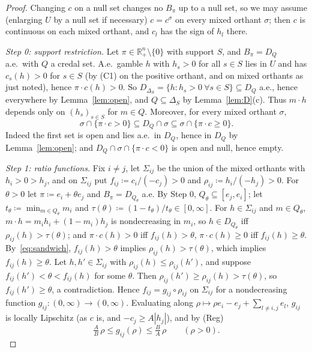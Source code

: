 \documentclass[11pt]{article}
\newcommand{\R}{\mathbb{R}}
\theoremstyle{plain}
\theoremstyle{definition}
\theoremstyle{remark}
\begin{document}
\begin{proof}
Changing $c$ on a null set changes no $B_\pi$ up to a null set, so we may assume
(enlarging $U$ by a null set if necessary) $c=c^\sigma$ on every mixed orthant $\sigma$; then $c$ is continuous on each mixed orthant,
and $c_l$ has the sign of $h_l$ there.

\emph{Step 0: support restriction.} Let $\pi\in\R^n_+\setminus\{0\}$ with support $S$, and
$B_\pi=D_Q$ a.e.\ with $Q$ a credal set. A.e.\ gamble $h$ with $h_s>0$ for all $s\in S$
lies in $U$ and has $c_s(h)>0$ for $s\in S$ (by (C1) on the positive orthant, and on mixed
orthants as just noted), hence $\pi\cdot c(h)>0$. So $D_{\Delta_S}=\{h:h_s>0\ \forall s\in
S\}\subseteq D_Q$ a.e., hence everywhere by Lemma~\ref{lem:open}, and $Q\subseteq\Delta_S$
by Lemma~\ref{lem:D}(c). Thus $m\cdot h$ depends only on $(h_s)_{s\in S}$ for $m\in Q$.
Moreover, for every mixed orthant $\sigma$,
\begin{equation}\label{eq:sandwich}
  \sigma\cap\{\pi\cdot c>0\}\subseteq D_Q\cap\sigma\subseteq\sigma\cap\{\pi\cdot c\ge0\}.
\end{equation}
Indeed the first set is open and lies a.e.\ in $D_Q$, hence in $D_Q$ by
Lemma~\ref{lem:open}; and $D_Q\cap\sigma\cap\{\pi\cdot c<0\}$ is open and null, hence
empty.

\emph{Step 1: ratio functions.} Fix $i\ne j$, let $\Sigma_{ij}$ be the union of the mixed
orthants with $h_i>0>h_j$, and on $\Sigma_{ij}$ put $f_{ij}\coloneqq c_i/(-c_j)>0$ and
$\rho_{ij}\coloneqq h_i/(-h_j)>0$. For $\theta>0$ let $\pi\coloneqq e_i+\theta e_j$ and
$B_\pi=D_{Q_\theta}$ a.e. By Step 0, $Q_\theta\subseteq[e_j,e_i]$; let $t_\theta\coloneqq
\min_{m\in Q_\theta}m_i$ and $\tau(\theta)\coloneqq(1-t_\theta)/t_\theta\in[0,\infty]$. For
$h\in\Sigma_{ij}$ and $m\in Q_\theta$, $m\cdot h=m_ih_i+(1-m_i)h_j$ is nondecreasing in
$m_i$, so $h\in D_{Q_\theta}$ iff $\rho_{ij}(h)>\tau(\theta)$; and $\pi\cdot c(h)>0$ iff
$f_{ij}(h)>\theta$, $\pi\cdot c(h)\ge0$ iff $f_{ij}(h)\ge\theta$. By~\eqref{eq:sandwich},
$f_{ij}(h)>\theta$ implies $\rho_{ij}(h)>\tau(\theta)$, which implies $f_{ij}(h)\ge\theta$.
Let $h,h'\in\Sigma_{ij}$ with $\rho_{ij}(h)\le\rho_{ij}(h')$, and suppose
$f_{ij}(h')<\theta<f_{ij}(h)$ for some $\theta$. Then $\rho_{ij}(h')\ge\rho_{ij}(h)>
\tau(\theta)$, so $f_{ij}(h')\ge\theta$, a contradiction. Hence $f_{ij}=g_{ij}\circ
\rho_{ij}$ on $\Sigma_{ij}$ for a nondecreasing function $g_{ij}:(0,\infty)\to(0,\infty)$.
Evaluating along $\rho\mapsto\rho e_i-e_j+\sum_{l\ne i,j}e_l$, $g_{ij}$ is locally
Lipschitz (as $c$ is, and $-c_j\ge A|h_j|$), and by (Reg)
\begin{equation}\label{eq:gbounds}
  \tfrac AB\,\rho\le g_{ij}(\rho)\le\tfrac BA\,\rho\qquad(\rho>0).
\end{equation}


\end{proof}
\end{document}
